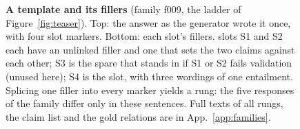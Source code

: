 \begin{figure}[t]
\centering
{}
\par\medskip
{\scriptsize}
\caption{\textbf{A template and its fillers} (family f009, the ladder of
Figure~\ref{fig:teaser}). Top: the answer as the generator wrote it once, with four slot markers.
Bottom: each slot's fillers.  slots S1 and S2 each have an unlinked filler and one
that sets the two claims against each other; S3 is the spare that stands in if S1 or S2 fails
validation (unused here); S4 is the  slot, with three wordings of one entailment.
Splicing one filler into every marker yields a rung: the five responses of the family differ only
in these sentences. Full texts of all rungs, the claim list and the gold relations are in
App.~\ref{app:families}.}
\label{fig:template}
\end{figure}

